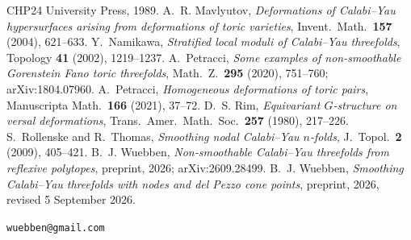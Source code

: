 \documentclass[11pt]{amsart}
\theoremstyle{definition}
\theoremstyle{remark}
\begin{document}
\begin{thebibliography}{CHP24}
University Press, 1989.
 A.~R. Mavlyutov, \emph{Deformations of Calabi--Yau
hypersurfaces arising from deformations of toric varieties},
Invent.\ Math.\ \textbf{157} (2004), 621--633.
 Y.~Namikawa, \emph{Stratified local moduli of
Calabi--Yau threefolds}, Topology \textbf{41} (2002), 1219--1237.
 A.~Petracci,
\emph{Some examples of non-smoothable Gorenstein Fano toric threefolds},
Math.\ Z.\ \textbf{295} (2020), 751--760; arXiv:1804.07960.
 A.~Petracci, \emph{Homogeneous deformations of
toric pairs}, Manuscripta Math.\ \textbf{166} (2021), 37--72.
 D.~S. Rim, \emph{Equivariant $G$-structure on versal
deformations}, Trans.\ Amer.\ Math.\ Soc.\ \textbf{257} (1980), 217--226.
 S.~Rollenske and R.~Thomas, \emph{Smoothing
nodal Calabi--Yau $n$-folds}, J.\ Topol.\ \textbf{2} (2009), 405--421.
 B.~J. Wuebben, \emph{Non-smoothable Calabi--Yau
threefolds from reflexive polytopes}, preprint, 2026; arXiv:2609.28499.
 B.~J. Wuebben, \emph{Smoothing Calabi--Yau threefolds with nodes and del Pezzo cone points},
preprint, 2026, revised 5 September 2026.
\end{thebibliography}

\bigskip
{} \texttt{wuebben@gmail.com}
\end{document}
